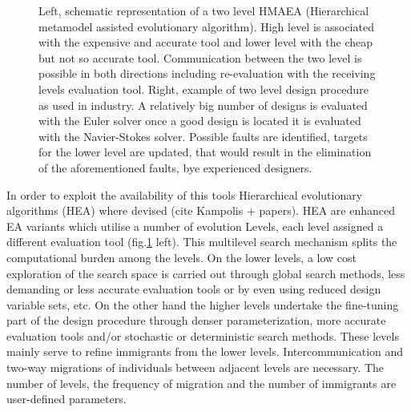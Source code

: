 \begin{figure}[h!]
\begin{minipage}[b]{1.0\linewidth}
 \centering
\end{minipage}
\caption{Left, schematic representation of a two level HMAEA (Hierarchical metamodel assisted evolutionary algorithm). High level is associated with the expensive and accurate tool and lower level with the cheap but not so accurate tool. Communication between the two level is possible in both directions including re-evaluation with the receiving levels evaluation tool. Right, example of two level design procedure as used in industry. A relatively big number of designs is evaluated with the Euler solver once a good design is located it is evaluated with the Navier-Stokes solver. Possible faults are identified, targets for the lower level are updated, that would result in the  elimination of the aforementioned faults, bye experienced designers.}
\label{HMAEA}
\end{figure} 
 
In order to exploit the availability of this tools Hierarchical evolutionary algorithms (HEA) where devised (cite Kampolis + papers). HEA are enhanced EA variants which utilise a number of evolution Levels, each level assigned a different evaluation tool (fig.\ref{HMAEA} left). This multilevel search mechanism splits the computational burden among the levels. On the lower levels, a low cost exploration of the search space is carried out through global search methods, less demanding or less accurate evaluation tools or by even using reduced design variable sets, etc. On the other hand the higher levels undertake the fine-tuning part of the design procedure through denser parameterization, more accurate evaluation tools and/or stochastic or deterministic search methods. These levels mainly serve to refine immigrants from the lower levels. Intercommunication and two-way migrations of individuals between adjacent levels are necessary. The number of levels, the frequency of migration and the number of immigrants are user-defined parameters.


